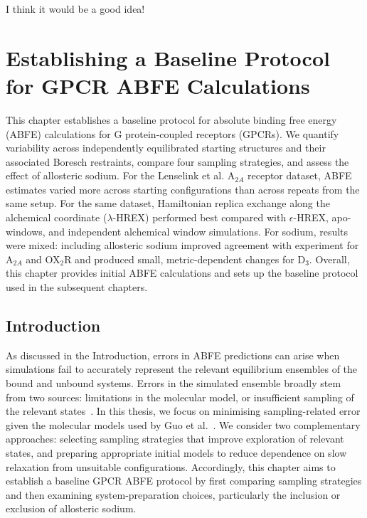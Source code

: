 \begin{savequote}[75mm]
I think it would be a good idea!
\end{savequote}
\chapter{Establishing a Baseline Protocol for GPCR ABFE Calculations}
\label{ch:benchmarking-and-system-preparation}

This chapter establishes a baseline protocol for absolute binding free energy (ABFE) calculations for G protein-coupled receptors (GPCRs). We quantify variability across independently equilibrated starting structures and their associated Boresch restraints, compare four sampling strategies, and assess the effect of allosteric sodium. For the Lenselink et al. A$_{2A}$ receptor dataset, ABFE estimates varied more across starting configurations than across repeats from the same setup. For the same dataset, Hamiltonian replica exchange along the alchemical coordinate ($\lambda$-HREX) performed best compared with $\epsilon$-HREX, apo-windows, and independent alchemical window simulations. For sodium, results were mixed: including allosteric sodium improved agreement with experiment for A$_{2A}$ and OX$_2$R and produced small, metric-dependent changes for D$_3$. Overall, this chapter provides initial ABFE calculations and sets up the baseline protocol used in the subsequent chapters.

\newpage
\section{Introduction}

As discussed in the Introduction, errors in ABFE predictions can arise when simulations fail to accurately represent the relevant equilibrium ensembles of the bound and unbound systems. Errors in the simulated ensemble broadly stem from two sources: limitations in the molecular model, or insufficient sampling of the relevant states~\cite{mey2020best}. In this thesis, we focus on minimising sampling-related error given the molecular models used by Guo et al.~\cite{guo2023benchmark}. We consider two complementary approaches: selecting sampling strategies that improve exploration of relevant states, and preparing appropriate initial models to reduce dependence on slow relaxation from unsuitable configurations. Accordingly, this chapter aims to establish a baseline GPCR ABFE protocol by first comparing sampling strategies and then examining system-preparation choices, particularly the inclusion or exclusion of allosteric sodium.

